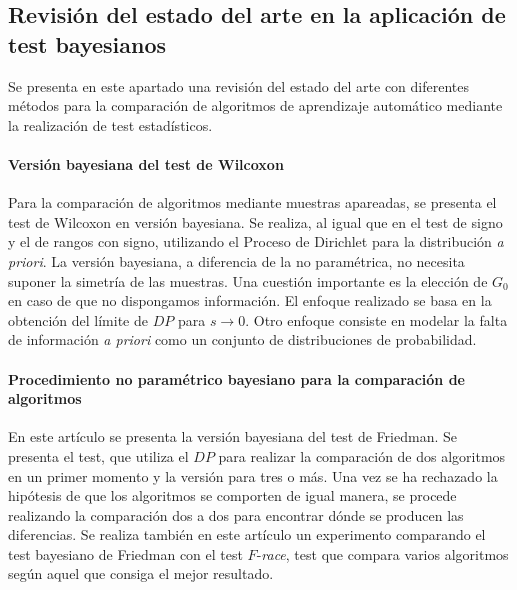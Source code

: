 \subsection{Revisión del estado del arte en la aplicación de test bayesianos}

	Se presenta en este apartado una revisión del estado del 
arte con diferentes métodos para la comparación de algoritmos
de aprendizaje automático mediante la realización de test 
estadísticos. 

\paragraph{Versión bayesiana del test de Wilcoxon} 
\cite{BENAVOLI14} Para la comparación de algoritmos mediante
muestras apareadas, se presenta el test de Wilcoxon en 
versión bayesiana. Se realiza, al igual que en el test
de signo y el de rangos con signo, utilizando el Proceso de
Dirichlet para la distribución \textit{a priori}. La versión 
bayesiana, a diferencia de la no paramétrica, no necesita 
suponer la simetría de las muestras. Una cuestión importante
es la elección de $G_0$ en caso de que no dispongamos
información. El enfoque realizado se basa en la obtención
del límite de $DP$ para $s \rightarrow 0$. Otro enfoque 
consiste en modelar la falta de información \textit{a priori} 
como un conjunto de distribuciones de probabilidad. 

\paragraph{Procedimiento no paramétrico bayesiano para la 
comparación de algoritmos} \cite{BENAVOLI15a} En este 
artículo se presenta la versión bayesiana del test de 
Friedman. Se presenta el test, que utiliza el $DP$ para 
realizar la comparación de dos algoritmos en un primer
momento y la versión para tres o más. Una vez se ha rechazado 
la hipótesis de que los algoritmos se comporten de igual
manera, se procede realizando la comparación dos a dos 
para encontrar dónde se producen las diferencias. Se realiza 
también en este artículo un experimento comparando el test
bayesiano de Friedman con el test $F$-\textit{race}, test que
compara varios algoritmos según aquel que consiga el mejor
resultado.

